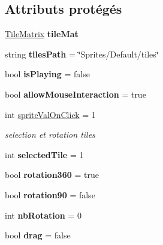 \subsection*{Attributs protégés}
\begin{DoxyCompactItemize}
\item 
\mbox{\label{class_tile_editor_ac1ba22e5c189adf64f6eb71ed90d5924}} 
\hyperlink{class_tile_matrix}{Tile\+Matrix} {\bfseries tile\+Mat}
\item 
\mbox{\label{class_tile_editor_a222606c81c49c52b69eadb80103484ff}} 
string {\bfseries tiles\+Path} = \char`\"{}Sprites/Default/tiles\char`\"{}
\item 
\mbox{\label{class_tile_editor_a2ca856979ced0f783d77d0fe80a16cf8}} 
bool {\bfseries is\+Playing} = false
\item 
\mbox{\label{class_tile_editor_a48d125806d896759d59983afc8aa345b}} 
bool {\bfseries allow\+Mouse\+Interaction} = true
\item 
int \hyperlink{class_tile_editor_a6b7e8a9c28da445fcc357c5814ec2c7e}{sprite\+Val\+On\+Click} = 1
\begin{DoxyCompactList}\small\item\em selection et rotation tiles \end{DoxyCompactList}\item 
\mbox{\label{class_tile_editor_a30265310bbb8b7e488c4ff7e50420d07}} 
int {\bfseries selected\+Tile} = 1
\item 
\mbox{\label{class_tile_editor_ac336b90b7a83a77ba980ddf5cda8b47c}} 
bool {\bfseries rotation360} = true
\item 
\mbox{\label{class_tile_editor_a2470a66145457aa97b863f3e055f61ff}} 
bool {\bfseries rotation90} = false
\item 
\mbox{\label{class_tile_editor_ab73669828f4e63cf8fd9de53fb51d88a}} 
int {\bfseries nb\+Rotation} = 0
\item 
\mbox{\label{class_tile_editor_ac80e6143a31707c94eccd73b13d66094}} 
bool {\bfseries drag} = false

\end{DoxyCompactItemize}
